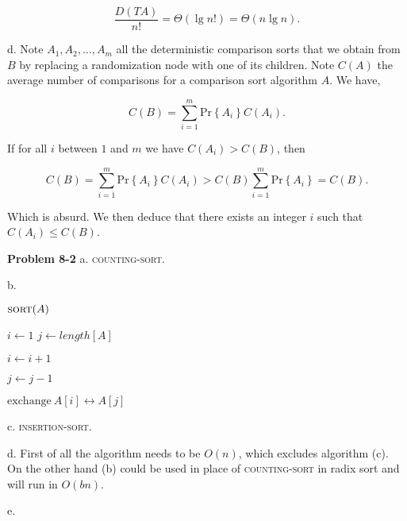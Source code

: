 \documentclass[a4paper,12pt]{article}
\newcommand{\newprob}[1]
{\bigskip \noindent \textbf{Problem #1} \newline}
\newcommand{\subpar}[1]{\medskip \noindent #1.}
\newcommand{\la}{\leftarrow}
\newcommand{\exchange}[2]{\mathrm{exchange}\ #1 \leftrightarrow #2}
\newcommand{\prob}[1]{\mathrm{Pr}\left\{ #1 \right\}}
\newenvironment{alg}[2]
               {\noindent $\textsc{#1}(#2)$ \begin{algorithmic}}
               {\end{algorithmic}}
\begin{document}
\[ \frac{D(TA)}{n!} = \Theta(\lg n!) = \Theta(n\lg n).\]

\subpar{d} Note $A_1, A_2, \ldots, A_m$ all the deterministic
comparison sorts that we obtain from $B$ by replacing a randomization
node with one of its children.  Note $C(A)$ the average number of
comparisons for a comparison sort algorithm $A$.  We have,

\[ C(B) = \sum_{i=1}^m \prob{A_i} C(A_i).\]

If for all $i$ between $1$ and $m$ we have $C(A_i) > C(B)$, then

\[ C(B) = \sum_{i=1}^m \prob{A_i} C(A_i) > C(B) \sum_{i=1}^m
\prob{A_i} = C(B).\]

Which is absurd.  We then deduce that there exists an integer $i$ such
that $C(A_i) \le C(B)$.

\newprob{8-2} \subpar{a} \textsc{counting-sort}.

\subpar{b}

\begin{alg}{sort}{A}
  \STATE $i \la 1$
  \STATE $j \la length[A]$


  \STATE $i \la i + 1$
  \ENDWHILE

  \STATE $j \la j - 1$
  \ENDWHILE

  \STATE $\exchange{A[i]}{A[j]}$
  \ENDWHILE
\end{alg}

\subpar{c} \textsc{insertion-sort}.

\subpar{d} First of all the algorithm needs to be $O(n)$, which excludes
algorithm (c).  On the other hand (b) could be used in place of
\textsc{counting-sort} in radix sort and will run in $O(bn)$.

\subpar{e}
\end{document}
